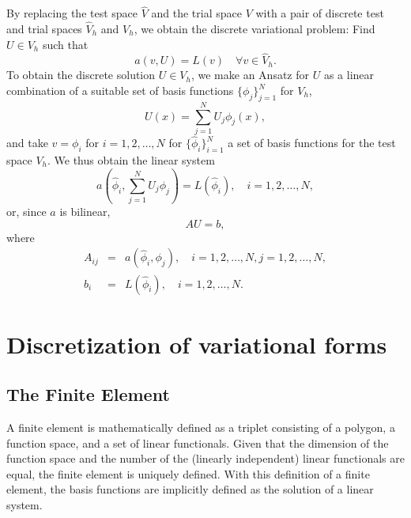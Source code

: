 By replacing the test space $\hat{V}$ and the trial space $V$ with a
pair of discrete test and trial spaces $\hat{V}_h$ and $V_h$, we
obtain the discrete variational problem: Find $U \in V_h$ such that
\begin{equation}
  a(v, U) = L(v) \quad \forall v \in \hat{V}_h.
\end{equation}
To obtain the discrete solution $U \in V_h$, we make an Ansatz
 for $U$ as a linear combination of a
suitable set of basis functions $\{\phi_j\}_{j=1}^N$ for $V_h$,
\begin{equation}
  U(x) = \sum_{j=1}^N U_j \phi_j(x),
\end{equation}
and take $v = \phi_i$ for $i = 1,2,\ldots,N$ for
$\{\hat{\phi}_i\}_{i=1}^N$ a set of basis functions for the test space
$V_h$. We thus obtain the linear system
\begin{equation}
  a(\hat{\phi}_i, \sum_{j=1}^N U_j \phi_j) = L(\hat{\phi}_i), \quad i = 1,2,\ldots,N,
\end{equation}
or, since $a$ is bilinear,
\begin{equation}
  A U = b,
\end{equation}
where
\begin{eqnarray}
  A_{ij} &=& a(\hat{\phi}_i, \phi_j), \quad i = 1,2,\ldots,N, j = 1,2,\ldots,N, \\
  b_i &=& L(\hat{\phi}_i), \quad i = 1,2,\ldots,N.
\end{eqnarray}

\section{Discretization of variational forms}

\subsection{The Finite Element}

A finite element is mathematically defined as a triplet consisting
of a polygon, a function space, and a set of linear functionals. 
Given that the dimension of the function space and the number of
the (linearly independent) linear functionals are equal, the
finite element is uniquely defined. 
With this definition of a finite element, the basis functions
are implicitly defined as the solution of a linear system.

